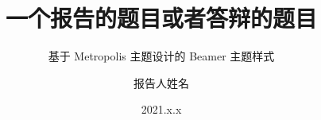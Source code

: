 

\title{一个报告的题目或者答辩的题目}
\subtitle{基于 Metropolis 主题设计的 Beamer 主题样式}


\author[姓名]{报告人姓名}


\date[2021.x.x]{2021.x.x}